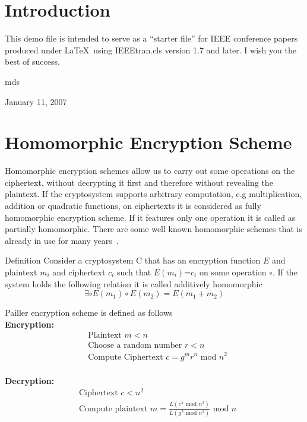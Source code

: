 \documentclass[conference]{IEEEtran}
\begin{document}
\section{Introduction}
This demo file is intended to serve as a ``starter file''
for IEEE conference papers produced under \LaTeX\ using
IEEEtran.cls version 1.7 and later.
I wish you the best of success.

\hfill mds

\hfill January 11, 2007

\section{Homomorphic Encryption Scheme}
Homomorphic encryption schemes allow us to carry  out  some operations  on  the  ciphertext,  without
decrypting it first and therefore without revealing the plaintext.
If the cryptosystem supports arbitrary computation, e.g multiplication, addition or quadratic functions, on ciphertexts it is considered as fully homomorphic encryption scheme.
 If it features only one operation it is called as partially homomorphic. There are some well known homomorphic schemes that is already in use for many years~\cite{Ferrer2002, Gentry2009}.

Definition
Consider a cryptosystem C that has an encryption function $E$ and plaintext $m_i$ and ciphertext $c_i$ such that $E(m_i)$=$c_i$ on some operation $\circ$.
If the system holds the following relation it is called additively homomorphic\\
\[
 \exists \circ E(m_1) \circ E(m_2) = E(m_1 +m_2 )
 \]


Pailler encryption scheme is defined as follows\\
\textbf{Encryption:}
\begin{align*}
&\text{Plaintext  }  m < n\\
&\text{Choose a random number  }
 r < n\\
&\text{Compute Ciphertext  }
 c=g^m r^n \text{ mod } n^2\\
 \end{align*}

\textbf{Decryption:}
\begin{align*}
&\text{Ciphertext  }  c < n^2\\
&\text{Compute plaintext  }
 m =\frac{L(c^\lambda \text{ mod } n^2 )}{L(g^\lambda \text{ mod } n^2 )} \text{ mod } n \\
 \end{align*}
\end{document}
